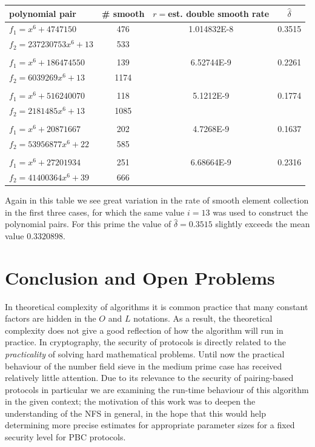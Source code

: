 \documentclass[a4paper, 12pt, envcountsect, runningheads]{llncs}
\numberwithin{figure}{section}
\numberwithin{equation}{section}
\begin{document}
\begin{tabular}{l|ccc}
polynomial pair & \# smooth & $r=$est. double smooth rate & $\hat{\delta}$\\
\hline
$f_1=x^6+4747150$ &476&1.014832E-8&0.3515\\
$f_2=237230753x^6+13$ &533&&\\
&&&\\
$f_1=x^6+186474550$ &139&6.52744E-9&0.2261\\
$f_2=6039269x^6+13$ &1174&&\\
&&&\\
$f_1=x^6+516240070$ &118&5.1212E-9&0.1774\\
$f_2=2181485x^6+13$ &1085&&\\
&&&\\
$f_1=x^6+20871667$ &202&4.7268E-9&0.1637\\
$f_2=53956877x^6+22$ &585&&\\
&&&\\
$f_1=x^6+27201934$ &251&6.68664E-9&0.2316\\
$f_2=41400364x^6+39$ &666&&\\
\end{tabular}
Again in this table we see great variation in the rate of smooth element collection in the first three cases, for which the same value $i=13$ was used to construct the polynomial pairs. For this prime the value of $\hat{\delta}=0.3515$ slightly exceeds the mean value $0.3320898$.

\section{Conclusion and Open Problems}
\label{s:conclusion}
In theoretical complexity of algorithms it is common practice that many constant factors are hidden in the $O$ and $L$ notations. As a result, the theoretical complexity does not give a good reflection of how the algorithm will run in practice.  
In cryptography, the security of protocols is directly related to the {\em practicality} of solving hard mathematical problems. Until now the practical behaviour of the number field sieve in the medium prime case has received relatively little attention. Due to its relevance to the security of pairing-based protocols in particular we are examining the run-time behaviour of this algorithm in the given context; the motivation of this work was to deepen the understanding of the NFS in general, in the hope that this would help determining more precise estimates for appropriate parameter sizes for a fixed security level for PBC protocols. 
\end{document}
